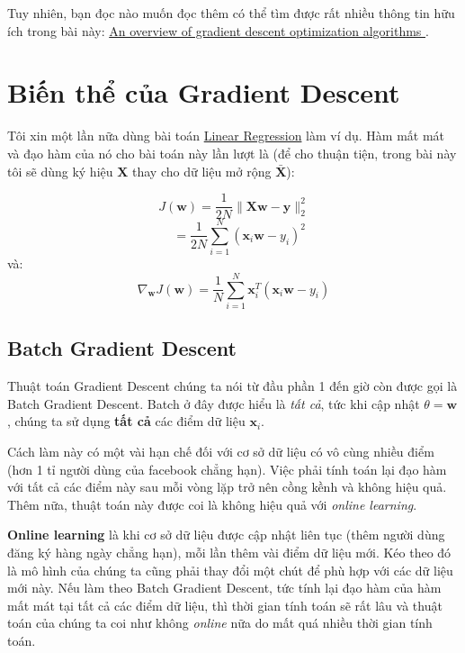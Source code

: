 Tuy nhiên, bạn đọc nào muốn đọc thêm có thể tìm được rất nhiều thông tin hữu ích trong bài này: 
\href{http://sebastianruder.com/optimizing-gradient-descent/index.html#stochasticgradientdescent}{An overview of gradient descent optimization algorithms }. 
 
 
\section{Biến thể của Gradient Descent}
Tôi xin một lần nữa dùng bài toán \href{http://machinelearningcoban.com/2016/12/28/linearregression/}{Linear Regression} làm ví dụ. Hàm mất mát và đạo hàm của nó cho bài toán này lần lượt là (để cho thuận tiện, trong bài này tôi sẽ dùng ký hiệu $\mathbf{X}$ thay cho dữ liệu mở rộng $\bar{\mathbf{X}}$): 
 
\begin{equation} 
J(\mathbf{w}) = \frac{1}{2N}\|\mathbf{X}\mathbf{w} - \mathbf{y}\|_2^2 
\end{equation} 
\begin{equation} 
~~~~ = \frac{1}{2N} \sum_{i=1}^N(\mathbf{x}_i \mathbf{w} - y_i)^2 
\end{equation} 
và: 
\begin{equation} 
\nabla_{\mathbf{w}} J(\mathbf{w}) = \frac{1}{N}\sum_{i=1}^N \mathbf{x}_i^T(\mathbf{x}_i\mathbf{w} - y_i) 
\end{equation} 
 
 
\subsection{Batch Gradient Descent }
Thuật toán Gradient Descent chúng ta nói từ đầu phần 1 đến giờ còn được gọi là Batch Gradient Descent. Batch ở đây được hiểu là \textit{tất cả}, tức khi cập nhật $\theta = \mathbf{w}$, chúng ta sử dụng \textbf{tất cả} các điểm dữ liệu $\mathbf{x}_i$.  
 
Cách làm này có một vài hạn chế đối với cơ sở dữ liệu có vô cùng nhiều điểm (hơn 1 tỉ người dùng của facebook chẳng hạn). Việc phải tính toán lại đạo hàm với tất cả các điểm này sau mỗi vòng lặp trở nên cồng kềnh và không hiệu quả. Thêm nữa, thuật toán này được coi là không hiệu quả với \textit{online learning}. 
 
 
\textbf{Online learning} là khi cơ sở dữ liệu được cập nhật liên tục (thêm người dùng đăng ký hàng ngày chẳng hạn), mỗi lần thêm vài điểm dữ liệu mới. Kéo theo đó là mô hình của chúng ta cũng phải thay đổi một chút để phù hợp với các dữ liệu mới này. Nếu làm theo Batch Gradient Descent, tức tính lại đạo hàm của hàm mất mát tại tất cả các điểm dữ liệu, thì thời gian tính toán sẽ rất lâu và thuật toán của chúng ta coi như không \textit{online} nữa do mất quá nhiều thời gian tính toán. 
 
